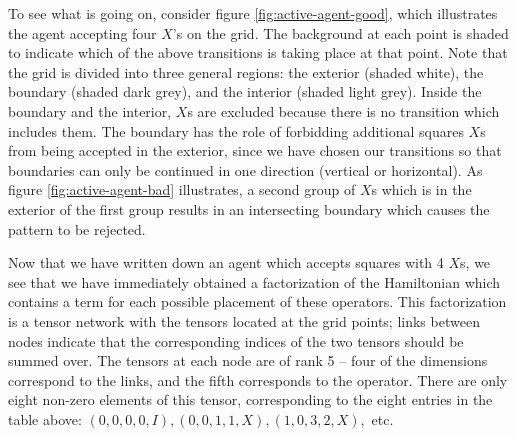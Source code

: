 \documentclass{amsbook}
\theoremstyle{plain}
\theoremstyle{definition}
\theoremstyle{remark}
\begin{document}
To see what is going on, consider figure \ref{fig:active-agent-good}, which illustrates the agent accepting four $X$'s on the grid.  The background at each point is shaded to indicate which of the above transitions is taking place at that point.  Note that the grid is divided into three general regions:  the exterior (shaded white), the boundary (shaded dark grey), and the interior (shaded light grey).  Inside the boundary and the interior, $X$s are excluded because there is no transition which includes them.  The boundary has the role of forbidding additional squares $X$s from being accepted in the exterior, since we have chosen our transitions so that boundaries can only be continued in one direction (vertical or horizontal).  As figure \ref{fig:active-agent-bad} illustrates, a second group of $X$s which is in the exterior of the first group results in an intersecting boundary which causes the pattern to be rejected.

Now that we have written down an agent which accepts squares with 4 $X$s, we see that we have immediately obtained a factorization of the Hamiltonian which contains a term for each possible placement of these operators.  This factorization is a tensor network with the tensors located at the grid points;  links between nodes indicate that the corresponding indices of the two tensors should be summed over.  The tensors at each node are of rank 5 -- four of the dimensions correspond to the links, and the fifth corresponds to the operator.  There are only eight non-zero elements of this tensor, corresponding to the eight entries in the table above: $(0,0,0,0,I), (0,0,1,1,X), (1,0,3,2,X),$ etc.

\end{document}
